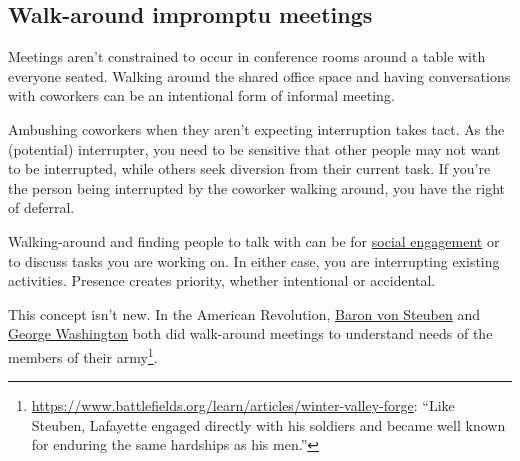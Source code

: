\subsection*{Walk-around impromptu meetings\label{sec:walk-arounds}}

Meetings aren't constrained to occur in conference rooms around a table with everyone seated. Walking around the shared office space and having conversations with coworkers can be an intentional form of informal meeting. 

Ambushing coworkers when they aren't expecting interruption takes tact. As the (potential) interrupter, you need to be sensitive that other people may not want to be interrupted, while others seek diversion from their current task. If you're the person being interrupted by the coworker walking around, you have the right of deferral. 


Walking-around and finding people to talk with can be for 
\hyperref[sec:socializing]{social engagement} 
or to discuss tasks you are working on. 
In either case, you are interrupting existing activities. Presence creates priority,
whether intentional or accidental.





This concept isn't new. 
In the American Revolution, \href{https://en.wikipedia.org/wiki/Friedrich_Wilhelm_von_Steuben}{Baron von Steuben}
and 
\href{https://en.wikipedia.org/wiki/George_Washington}{George Washington}
both did walk-around meetings to understand needs of the members of their army\footnote{\href{https://www.battlefields.org/learn/articles/winter-valley-forge}{https://www.battlefields.org/learn/articles/winter-valley-forge}: ``Like Steuben, Lafayette engaged directly with his soldiers and became well known for enduring the same hardships as his men.''}.
